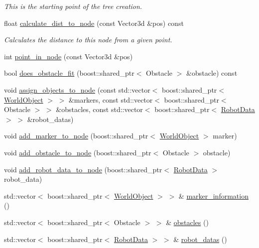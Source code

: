 \begin{CompactItemize}
\begin{CompactList}\small\item\em This is the starting point of the tree creation. \item\end{CompactList}\item 
float \hyperlink{class_octree_2108bbcd5fecadd8e3f072f871c5632c}{calculate\_\-dist\_\-to\_\-node} (const Vector3d \&pos) const 
\begin{CompactList}\small\item\em Calculates the distance to this node from a given point. \item\end{CompactList}\item 
int \hyperlink{class_octree_de868d730ef2ebe1442d0cc65cfc4f39}{point\_\-in\_\-node} (const Vector3d \&pos)
\item 
bool \hyperlink{class_octree_09d72bc24be26e5814e01ee2674545b1}{does\_\-obstacle\_\-fit} (boost::shared\_\-ptr$<$ Obstacle $>$ \&obstacle) const 
\item 
void \hyperlink{class_octree_7c327c632fbbcac0676ccd8dda9d99ce}{assign\_\-objects\_\-to\_\-node} (const std::vector$<$ boost::shared\_\-ptr$<$ \hyperlink{class_world_object}{WorldObject} $>$ $>$ \&markers, const std::vector$<$ boost::shared\_\-ptr$<$ Obstacle $>$ $>$ \&obstacles, const std::vector$<$ boost::shared\_\-ptr$<$ \hyperlink{class_robot_data}{RobotData} $>$ $>$ \&robot\_\-datas)
\item 
void \hyperlink{class_octree_1e97431b76893f009beca8578f365ca9}{add\_\-marker\_\-to\_\-node} (boost::shared\_\-ptr$<$ \hyperlink{class_world_object}{WorldObject} $>$ marker)
\item 
void \hyperlink{class_octree_bf82f696a0f350ad2eae35431e971a66}{add\_\-obstacle\_\-to\_\-node} (boost::shared\_\-ptr$<$ Obstacle $>$ obstacle)
\item 
void \hyperlink{class_octree_c09b4c93c005fd24b6feb35147d6cfd1}{add\_\-robot\_\-data\_\-to\_\-node} (boost::shared\_\-ptr$<$ \hyperlink{class_robot_data}{RobotData} $>$ robot\_\-data)
\item 
std::vector$<$ boost::shared\_\-ptr$<$ \hyperlink{class_world_object}{WorldObject} $>$ $>$ \& \hyperlink{class_octree_b87eff58fb428441817a569e4674a414}{marker\_\-information} ()
\item 
std::vector$<$ boost::shared\_\-ptr$<$ Obstacle $>$ $>$ \& \hyperlink{class_octree_0f5d4b3c958b35605eb5f8ed808dc021}{obstacles} ()
\item 
std::vector$<$ boost::shared\_\-ptr$<$ \hyperlink{class_robot_data}{RobotData} $>$ $>$ \& \hyperlink{class_octree_daef5372a7ebc7e42cc7f3004b68c1ed}{robot\_\-datas} ()

\end{CompactItemize}
